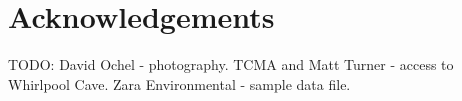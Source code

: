 \documentclass[10pt,twocolumn]{article}
\begin{document}
\section{Acknowledgements}
TODO:
David Ochel - photography. 
TCMA and Matt Turner - access to Whirlpool Cave. 
Zara Environmental - sample data file.

% 



\end{document}
